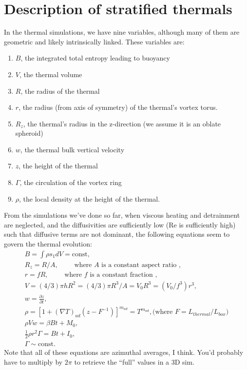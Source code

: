\documentclass[onecolumn, amsmath, amsfonts, amssymb]{aastex62}
\newcommand{\grad}{\ensuremath{\nabla}}
\begin{document}
\section{Description of stratified thermals}
In the thermal simulations, we have nine variables, although many of them are geometric and
likely intrinsically linked. These variables are:
\begin{enumerate}
\item $B$, the integrated total entropy leading to buoyancy
\item $V$, the thermal volume
\item $R$, the radius of the thermal
\item $r$, the radius (from axis of symmetry) of the thermal's vortex torus.
\item $R_z$, the thermal's radius in the z-direction (we assume it is an oblate spheroid)
\item $w$, the thermal bulk vertical velocity
\item $z$, the height of the thermal
\item $\Gamma$, the circulation of the vortex ring
\item $\rho$, the local density at the height of the thermal.
\end{enumerate}
From the simulations we've done so far, when viscous heating and detrainment are neglected, and the
diffusivities are sufficiently low (Re is sufficiently high) such that diffusive terms are not dominant, the following
equations seem to govern the thermal evolution:
\begin{gather}
B = \int \rho s_1 dV = \text{const}, \\
R_z = R/A,\qquad \text{ where $A$ is a constant aspect ratio },\\
r = f R, \qquad \text{ where $f$ is a constant fraction }, \\
V = (4/3)\pi h R^2 = (4/3)\pi R^3/A = V_0 R^3 = (V_0/f^3) r^3, \\
w = \frac{\partial z}{\partial t},\\
\rho = [1 + (\grad T)_{ad}(z - F^{-1})]^{m_{ad}} = T^{m_{ad}}, \text{(where $F = L_{thermal}/L_{box}$)}\\
\rho V w = \beta B t + M_0,  \label{eqn:momentum} \\
\frac{1}{2}\rho r^2 \Gamma = B t + I_0, \label{eqn:impulse} \\
\Gamma \sim \text{const.}
\end{gather}
Note that all of these equations are azimuthal averages, I think. You'd probably have to
multiply by $2\pi$ to retrieve the ``full'' values in a 3D sim.
\end{document}
